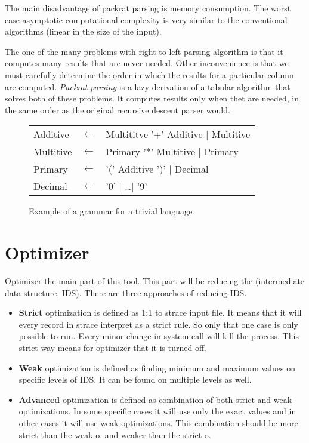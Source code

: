 The main disadvantage of packrat parsing is memory consumption.
The worst case asymptotic computational complexity is very similar to the conventional algorithms (linear in the size of the input).

The one of the many problems with right to left parsing algorithm is that it computes many results that are never needed.
Other inconvenience is that we must carefully determine the order in which the results for a particular column are computed.
\textit{Packrat parsing} is a lazy derivation of a tabular algorithm that solves both of these problems. It computes results only when thet are needed, in the same order as the original recursive descent parser would.
\cite{Ford:PEG}

\begin{figure}
	\begin{center}
  \begin{tabular}{lcl}
      Additive  & $\leftarrow$ & Multititve '+' Additive | Multitive \\
      Multitive & $\leftarrow$ & Primary '*' Multitive | Primary     \\
      Primary   & $\leftarrow$ & '(' Additive ')' | Decimal          \\
      Decimal   & $\leftarrow$ & '0' | \ldots | '9'
  \end{tabular}
  \end{center}
  \caption{Example of a grammar for a trivial language}
  \label{fig:pegtl:example}
 \end{figure}

\section{Optimizer}
Optimizer the main part of this tool.
This part will be reducing the (intermediate data structure, IDS).
There are three approaches of reducing IDS.
\begin{itemize}
  \item \textbf{Strict} optimization is defined as 1:1 to strace input file. It means that it will every record in strace interpret as a strict rule. So only that one case is only possible to run. Every minor change in system call will kill the process. This strict way means for optimizer that it is turned off.

  \item \textbf{Weak} optimization is defined as finding minimum and maximum values on specific levels of IDS. It can be found on multiple levels as well.

  \item \textbf{Advanced} optimization is defined as combination of both strict and weak optimizations. In some specific cases it will use only the exact values and in other cases it will use weak optimizations. This combination should be more strict than the weak o. and weaker than the strict o.
\end{itemize}

